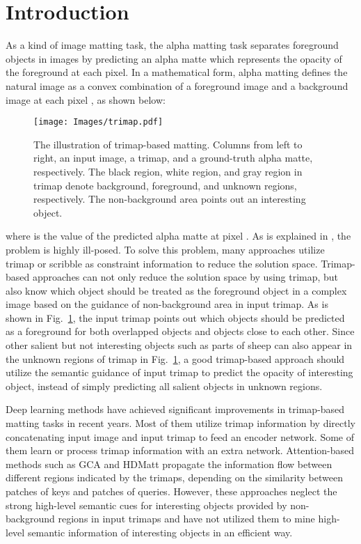 \documentclass[10pt,twocolumn,letterpaper]{article}
\begin{document}
\section{Introduction}
\label{sec:intro}

As a kind of image matting task, the alpha matting task separates foreground objects in images by predicting an alpha matte which represents the opacity of the foreground at each pixel. In a mathematical form, alpha matting defines the natural image  as a convex
combination of a foreground image  and a background image  at each pixel , as shown below:

\begin{figure}[t]
		\centering
		\texttt{[image: Images/trimap.pdf]}
		\caption{ The illustration of trimap-based matting. Columns from left to right, an input image, a trimap, and a ground-truth alpha matte, respectively. The black region, white region, and gray region in trimap denote background, foreground, and unknown regions, respectively. The non-background area points out an interesting object.}
		\label{trimap}
\end{figure}
where  is the value of the predicted alpha matte at pixel . As is explained in \cite{gca,adamatting}, the problem is highly ill-posed. To solve this problem, many approaches \cite{bayes_12,iterative} utilize trimap or scribble as constraint information to reduce the solution space. Trimap-based approaches can not only reduce the solution space by using trimap, but also know which object should be treated as the foreground object  in a complex image based on the guidance of non-background area in input trimap. As is shown in Fig.~\ref{trimap}, the input trimap points out which objects should be predicted as a foreground for both overlapped objects and objects close to each other. Since other salient but not interesting objects such as parts of sheep can also appear in the unknown regions of trimap in Fig.~\ref{trimap}, a good trimap-based approach should utilize the semantic guidance of input trimap to predict the opacity of interesting object, instead of simply predicting all salient objects in unknown regions.

Deep learning methods have  achieved significant improvements in trimap-based matting tasks in recent years. Most of them \cite{deepmatting,indexnet,context,fba,pii,lfpnet} utilize trimap information  by directly concatenating input image and input trimap to feed an encoder network. Some of them \cite{adamatting,sim,timinet} learn or process trimap information with  an extra network. Attention-based methods such as GCA \cite{gca} and HDMatt \cite{hdmatt} propagate the information flow between different regions indicated by the trimaps, depending on the similarity between patches of keys and patches of queries. However, these approaches neglect the strong high-level semantic cues for interesting objects provided by non-background regions in input trimaps and have not utilized them to mine high-level semantic information of interesting objects in an efficient way.
\end{document}
